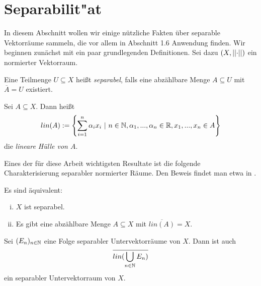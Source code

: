 \section{Separabilit"at}
In diesem Abschnitt wollen wir einige nützliche Fakten über separable Vektorräume sammeln, die vor allem in Abschnitt 1.6 Anwendung finden. 
Wir beginnen zunächst mit ein paar grundlegenden Definitionen. Sei dazu $(X, \lvert\lvert \cdot \rvert\rvert)$ ein normierter Vektorraum. 

\begin{mydef}
    Eine Teilmenge $U \subseteq X$ heißt \textit{separabel}, falls eine abzählbare Menge $A \subseteq U$ mit $\overline{A} = U$ existiert.
\end{mydef}

\begin{mydef}
    Sei $A \subseteq X$. Dann heißt 
    $$
        lin(A) := \left\{\sum_{i=1}^n \alpha_i x_i \  | \ n \in \mathbb{N}, \alpha_1,...,\alpha_n \in \mathbb{R}, x_1,...,x_n \in A \right\}
    $$
    die \textit{lineare Hülle von $A$}. 
\end{mydef}

Eines der für diese Arbeit wichtigsten Resultate ist die folgende Charakterisierung separabler normierter Räume. Den Beweis findet man etwa in \cite[Lemma I.2.9]{werner}.

\begin{theorem}
    Es sind äquivalent:
    \begin{enumerate}[(i)]
        \item $X$ ist separabel.
        \item Es gibt eine abzählbare Menge $A \subseteq X$ mit $\overline{lin(A)} = X$. 
    \end{enumerate}
\end{theorem}

\begin{corollary}
    Sei $(E_n)_{n \in \mathbb{N}}$ eine Folge separabler Untervektorräume von $X$. Dann ist auch 
    $$
        \overline{lin(\bigcup_{n \in \mathbb{N}}E_n)}
    $$
    ein separabler Untervektorraum von $X$. 
\end{corollary}

